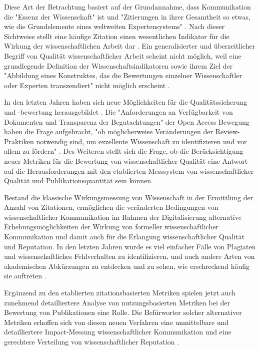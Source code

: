 \begin{enumerate}
\begin{end}
Diese Art der Betrachtung basiert auf der Grundannahme, dass Kommunikation die "Essenz der Wissenschaft"\cite{bonitz_1998_matthaus} ist und "Zitierungen in ihrer Gesamtheit so etwas, wie die Grundelemente eines weltweiten Expertensystems" \cite{bonitz_1990_sci}. Nach dieser Sichtweise stellt eine häufige Zitation einen wesentlichen Indikator für die Wirkung der wissenschaftlichen Arbeit dar \cite{hamilton_1990_publishing}. Ein generalisierter und überzeitlicher Begriff von Qualität wissenschaftlicher Arbeit scheint nicht möglich, weil eine grundlegende Definition der Wissenschaftsindikatoren sowie ihrem Ziel der "Abbildung eines Konstruktes, das die Bewertungen einzelner Wissenschaftler oder Experten transzendiert" nicht möglich erscheint \cite{Hornbostel_1997}.

In den letzten Jahren haben sich neue Möglichkeiten für die Qualitätssicherung und -bewertung herausgebildet \cite{rekdal_2014_academic}. Die "Anforderungen an Verfügbarkeit von Dokumenten und Transparenz der Begutachtungen" der Open Access Bewegung haben die Frage aufgebracht, "ob möglicherweise Veränderungen der Review-Praktiken notwendig sind, um exzellente Wissenschaft zu identifizieren und vor allem zu fördern" \cite{suchen_Hornbostel_2006}. Des Weiteren stellt sich die Frage, ob die Berücksichtigung neuer Metriken für die Bewertung von wissenschaftlicher Qualität eine Antwort auf die Herausforderungen mit den etablierten Messsystem von wissenschaftlicher Qualität und Publikationsquantität sein können.

Bestand die klassische Wirkungsmessung von Wissenschaft in der Ermittlung der Anzahl von Zitationen, ermöglichen die veränderten Bedingungen von wissenschaftlicher Kommunikation im Rahmen der Digitalisierung alternative Erhebungsmöglichkeiten der Wirkung von formeller wissenschaftlicher Kommunikation und damit auch für die Erlangung wissenschaftlicher Qualität und Reputation. In den letzten Jahren wurde es viel einfacher Fälle von Plagiaten und wissenschaftliches Fehlverhalten zu identifizieren, und auch andere Arten von akademischen Abkürzungen zu entdecken und zu sehen, wie erschreckend häufig sie auftreten \cite{rekdal_2014_academic}.

Ergänzend zu den etablierten zitationsbasierten Metriken spielen jetzt auch zunehmend detailliertere Analyse von nutzungsbasierten Metriken bei der Bewertung von Publikationen eine Rolle. Die Befürworter solcher alternativer Metriken erhoffen sich von diesen neuen Verfahren eine unmittelbare und detailliertere Impact-Messung wissenschaftlicher Kommunikation und eine gerechtere Verteilung von wissenschaftlicher Reputation \cite{suchen_ggf_herb}.


\end{end}
\end{enumerate}
